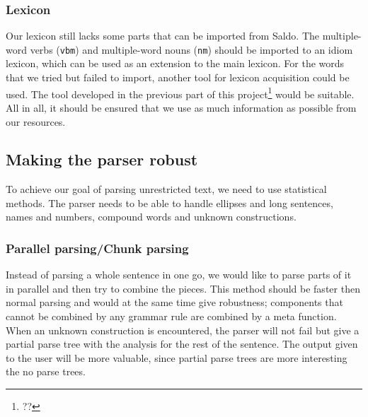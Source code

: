 \documentclass{report}
\begin{document}
\subsubsection{Lexicon}
Our lexicon still lacks some parts that can be imported from Saldo.
The multiple-word verbs (\verb-vbm-) and multiple-word nouns (\verb-nm-) should
be imported to an idiom lexicon, which can be used as an extension to the main
lexicon.
For the words that we tried but failed to import, another tool for lexicon
acquisition could be used. The tool developed in the previous part of
this project\footnote{??} would be suitable.
All in all, it should be ensured that we use as much information as
possible from our resources.


\subsection{Making the parser robust}
To achieve our goal of parsing unrestricted text, we need to use statistical methods.
The parser needs to be able to handle
ellipses and long sentences, names and numbers,
compound words and unknown constructions.

\subsubsection{Parallel parsing/Chunk parsing}
Instead of parsing a whole sentence in one go, we would like to
parse parts of it in parallel and then try to combine the pieces.
This method should be faster then normal parsing and would
at the same time give robustness;
components that cannot be combined by any grammar rule are combined by a 
meta function. When an unknown construction is encountered, the parser
will not fail but give a partial parse tree with the analysis for the rest of
the sentence.
The output given to the user will be more valuable, since partial parse
trees are more interesting the no parse trees.
\end{document}
